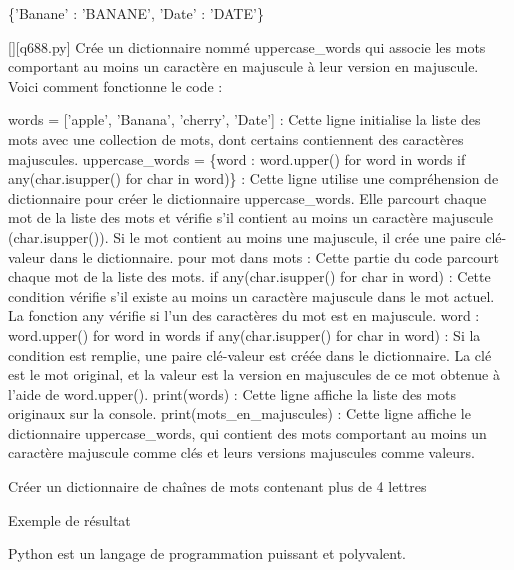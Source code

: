 \{'Banane' : 'BANANE', 'Date' : 'DATE'\}
        \par
        \begin{solution}
            \renewcommand{\nomfichier}{q688.py}
            \pythonfile{\chemincode \nomfichier}[][\nomfichier]
            Crée un dictionnaire nommé uppercase\_words qui associe les mots comportant au moins un caractère en majuscule à leur version en majuscule. Voici comment fonctionne le code :

    words = ['apple', 'Banana', 'cherry', 'Date'] : Cette ligne initialise la liste des mots avec une collection de mots, dont certains contiennent des caractères majuscules.
    uppercase\_words = \{word : word.upper() for word in words if any(char.isupper() for char in word)\} : Cette ligne utilise une compréhension de dictionnaire pour créer le dictionnaire uppercase\_words. Elle parcourt chaque mot de la liste des mots et vérifie s'il contient au moins un caractère majuscule (char.isupper()). Si le mot contient au moins une majuscule, il crée une paire clé-valeur dans le dictionnaire.
        pour mot dans mots : Cette partie du code parcourt chaque mot de la liste des mots.
        if any(char.isupper() for char in word) : Cette condition vérifie s'il existe au moins un caractère majuscule dans le mot actuel. La fonction any vérifie si l'un des caractères du mot est en majuscule.
        {word : word.upper() for word in words if any(char.isupper() for char in word)} : Si la condition est remplie, une paire clé-valeur est créée dans le dictionnaire. La clé est le mot original, et la valeur est la version en majuscules de ce mot obtenue à l'aide de word.upper().
    print(words) : Cette ligne affiche la liste des mots originaux sur la console.
    print(mots\_en\_majuscules) : Cette ligne affiche le dictionnaire uppercase\_words, qui contient des mots comportant au moins un caractère majuscule comme clés et leurs versions majuscules comme valeurs.
        \end{solution}
        

        \question
        Créer un dictionnaire de chaînes de mots contenant plus de 4 lettres

Exemple de résultat

Python est un langage de programmation puissant et polyvalent.

